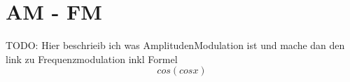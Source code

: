 %
%
%
\section{AM - FM\label{fm:section:teil0}}

TODO:
Hier beschrieib ich was AmplitudenModulation ist und mache dan den link zu Frequenzmodulation inkl Formel \[cos( cos x)\]






